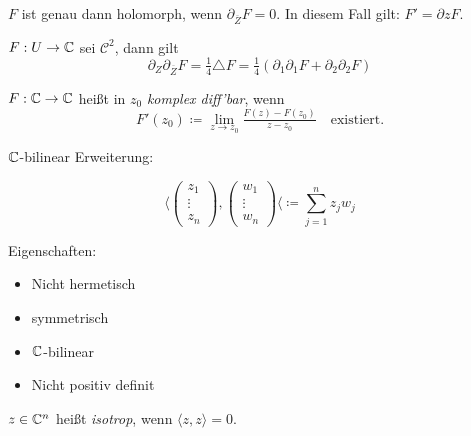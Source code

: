 \documentclass{cheat-sheet}
\begin{document}
\begin{lem}
  $F$ ist genau dann holomorph, wenn $\partial_{\overline{Z}} F = 0$. In diesem Fall gilt: $F' = \partial z F$.
\end{lem}

\begin{lem}
  $F : U \to \mathbb{C}$ sei $\mathcal{C}^2$, dann gilt
  \[ \partial_Z \partial_{\overline{Z}} F = \tfrac{1}{4} \triangle F = \tfrac{1}{4} (\partial_1 \partial_1 F + \partial_2 \partial_2 F) \]
\end{lem}


\begin{definition}
  $F : \mathbb{C} \to \mathbb{C}$ heißt in $z_0$ \emph{komplex diff'bar}, wenn
  \[ F'(z_0) \coloneqq \lim_{z \to z_0} \tfrac{F(z) - F(z_0)}{z - z_0} \quad \text{existiert.} \]
\end{definition}



$\mathbb{C}$-bilinear Erweiterung: %

\[ \langle \begin{pmatrix} z_1 \\ \vdots \\ z_n \end{pmatrix} , \begin{pmatrix} w_1 \\ \vdots \\ w_n \end{pmatrix} \langle \coloneqq \sum_{j=1}^n z_j w_j \]

Eigenschaften:

\begin{itemize}
  \item Nicht hermetisch
  \item symmetrisch
  \item $\mathbb{C}$-bilinear
  \item Nicht positiv definit
\end{itemize}

\begin{definition}
  $z \in \mathbb{C}^n$ heißt \emph{isotrop}, wenn $\langle z, z \rangle = 0$.
\end{definition}
\end{document}
